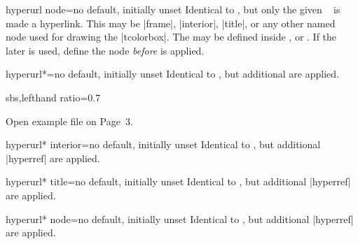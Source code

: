 \begin{docTcbKey}[][doc new=2017-02-03]{hyperurl node}{=}{no default, initially unset}
  Identical to , but only the given \tikzname\ 
  is made a hyperlink. This  may be |frame|, |interior|, |title|, or
  any other named node used for drawing the |tcolorbox|.
  The  may be defined inside
  ,  or .
  If the later is used, define the node \emph{before} 
  is applied.
\end{docTcbKey}


\begin{docTcbKey}[][doc new=2017-02-03]{hyperurl*}{=}{no default, initially unset}
  Identical to , but additional
   \cite{rahtz:hyperref}  are applied.
  \begin{dispExample*}{sbs,lefthand ratio=0.7}
\begin{tcolorbox}[enhanced,colback=green!50,
  hyperurl*={page=3,pdfnewwindow=true}%
            {tcolorbox-example.pdf}]
Open example file on Page~3.
\end{tcolorbox}
  \end{dispExample*}
\end{docTcbKey}

\begin{docTcbKey}[][doc new=2017-02-03]{hyperurl* interior}{=}{no default, initially unset}
  Identical to , but additional |hyperref| \cite{rahtz:hyperref}
   are applied.
\end{docTcbKey}

\begin{docTcbKey}[][doc new=2017-02-03]{hyperurl* title}{=}{no default, initially unset}
  Identical to , but additional |hyperref| \cite{rahtz:hyperref}
   are applied.
\end{docTcbKey}

\enlargethispage*{1cm}

\begin{docTcbKey}[][doc new=2017-02-03]{hyperurl* node}{=}{no default, initially unset}
  Identical to , but additional |hyperref| \cite{rahtz:hyperref}
   are applied.
\end{docTcbKey}



